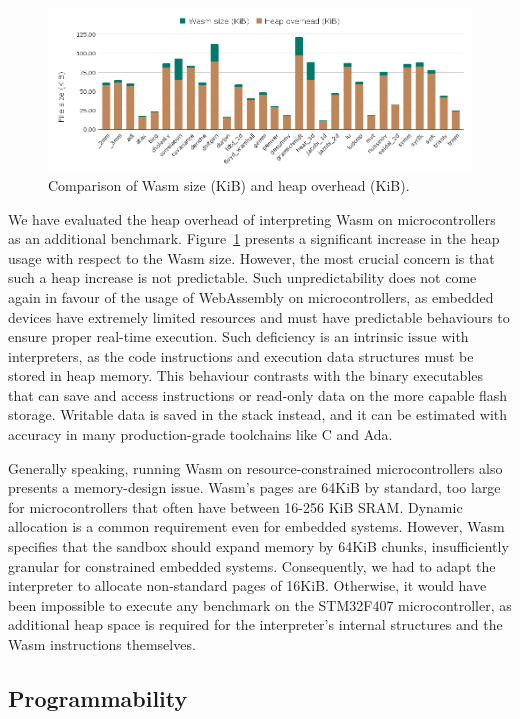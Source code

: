 \begin{figure}[ht]
\centering
\includegraphics[width=\columnwidth]{figures/b-wasmi-1}
\caption{Comparison of Wasm size (KiB) and heap overhead (KiB).}
\label{fig:b-wasmi-1}
\end{figure}

We have evaluated the heap overhead of interpreting Wasm on microcontrollers as an additional benchmark. 
Figure~\ref{fig:b-wasmi-1} presents a significant increase in the heap usage with respect to the Wasm size. However, the most crucial concern is that such a heap increase is not predictable. Such unpredictability does not come again in favour of the usage of WebAssembly on microcontrollers, as embedded devices have extremely limited resources and must have predictable behaviours to ensure proper real-time execution. Such deficiency is an intrinsic issue with interpreters, as the code instructions and execution data structures must be stored in heap memory. This behaviour contrasts with the binary executables that can save and access instructions or read-only data on the more capable flash storage. Writable data is saved in the stack instead, and it can be estimated with accuracy in many production-grade toolchains like C and Ada.

Generally speaking, running Wasm on resource-constrained microcontrollers also presents a memory-design issue. Wasm's pages are 64KiB by standard, too large for microcontrollers that often have between 16-256 KiB SRAM. Dynamic allocation is a common requirement even for embedded systems. However, Wasm specifies that the sandbox should expand memory by 64KiB chunks, insufficiently granular for constrained embedded systems. Consequently, we had to adapt the interpreter to allocate non-standard pages of 16KiB. Otherwise, it would have been impossible to execute any benchmark on the STM32F407 microcontroller, as additional heap space is required for the interpreter's internal structures and the Wasm instructions themselves.

\subsection{Programmability}
\label{p:Rust}

